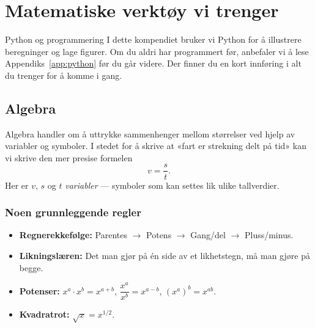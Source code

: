 \chapter{Matematiske verktøy vi trenger}

\begin{mymerk*}{Python og programmering}
I dette kompendiet bruker vi Python for å illustrere beregninger og lage figurer. Om du aldri har programmert før, anbefaler vi å lese Appendiks~\ref{app:python} før du går videre. Der finner du en kort innføring i alt du trenger for å komme i gang.
\end{mymerk*}

\section{Algebra}

Algebra handler om å uttrykke sammenhenger mellom størrelser ved hjelp av variabler og symboler. I stedet for å skrive at «fart er strekning delt på tid» kan vi skrive den mer presise formelen
\[
v = \frac{s}{t}.
\]
Her er $v$, $s$ og $t$ \emph{variabler} — symboler som kan settes lik ulike tallverdier.

\subsection*{Noen grunnleggende regler}
\begin{itemize}
    \item \textbf{Regnerekkefølge:} Parentes $\to$ Potens $\to$ Gang/del $\to$ Pluss/minus.
    \item \textbf{Likningslæren:} Det man gjør på én side av et likhetstegn, må man gjøre på begge.
    \item \textbf{Potenser:} $x^a \cdot x^b = x^{a+b}$, \quad $\dfrac{x^a}{x^b} = x^{a-b}$, \quad $(x^a)^b = x^{ab}$.
    \item \textbf{Kvadratrot:} $\sqrt{x} = x^{1/2}$.
\end{itemize}


